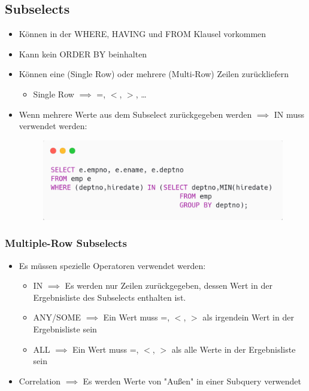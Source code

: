 \subsection{Subselects}
\begin{itemize}
    \item Können in der WHERE, HAVING und FROM Klausel vorkommen
    \item Kann kein ORDER BY beinhalten
    \item Können eine (Single Row) oder mehrere (Multi-Row) Zeilen zurückliefern
    \begin{itemize}
        \item Single Row $\implies$ =, $<$, $>$, \dots
    \end{itemize}
    \item Wenn mehrere Werte aus dem Subselect zurückgegeben werden $\implies$ IN muss verwendet werden:
    \begin{figure}[H]
        \centering
        \includegraphics[scale=.4]{res/themekorb_2/subselect_multiple.png} 
    \end{figure}
\end{itemize}

\subsubsection{Multiple-Row Subselects}
\begin{itemize}
    \item Es müssen spezielle Operatoren verwendet werden:
    \begin{itemize}
        \item IN $\implies$ Es werden nur Zeilen zurückgegeben, dessen Wert in der Ergebnisliste des Subselects enthalten ist.
        \item ANY/SOME $\implies$ Ein Wert muss =, $<$, $>$ als irgendein Wert in der Ergebnisliste sein
        \item ALL $\implies$ Ein Wert muss =, $<$, $>$ als alle Werte in der Ergebnisliste sein
    \end{itemize}
    \item Correlation $\implies$ Es werden Werte von "Außen" in einer Subquery verwendet
\end{itemize}

